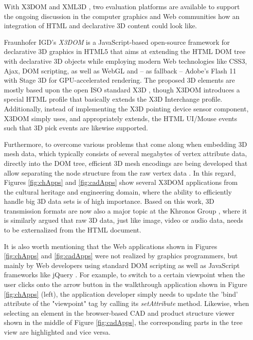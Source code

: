 \documentclass{acmsiggraph}
\begin{document}
With X3DOM \cite{Behr2009} and XML3D \cite{Sons2010}, two evaluation platforms are available to support the ongoing discussion in the computer graphics and Web communities how an integration of HTML and declarative 3D content could look like. 

Fraunhofer IGD's \emph{X3DOM} \cite{Behr2009,Behr12} is a JavaScript-based open-source framework for declarative 3D graphics in HTML5 that aims at extending the HTML DOM tree with declarative 3D objects while employing modern Web technologies like CSS3, Ajax, DOM scripting, as well as WebGL and -- as fallback -- Adobe's Flash 11 with Stage 3D \cite{flash} for GPU-accelerated rendering. The proposed 3D elements are mostly based upon the open ISO standard X3D \cite{Web3D-X3D}, though X3DOM introduces a special HTML profile that basically extends the X3D Interchange profile. Additionally, instead of implementing the X3D pointing device sensor component, X3DOM simply uses, and appropriately extends, the HTML UI/Mouse events such that 3D pick events are likewise supported.

Furthermore, to overcome various problems that come along when embedding 3D mesh data, which typically consists of several megabytes of vertex attribute data, directly into the DOM tree, efficient 3D mesh encodings are being developed that allow separating the node structure from the raw vertex data \cite{Behr12}. In this regard, Figures \ref{fig:chApps} and \ref{fig:cadApps} show several X3DOM applications from the cultural heritage and engineering domain, where the ability to efficiently handle big 3D data sets is of high importance.
Based on this work, 3D transmission formats are now also a major topic at the Khronos Group \cite{Trevett12}, where it is similarly argued that raw 3D data, just like image, video or audio data, needs to be externalized from the HTML document.

It is also worth mentioning that the Web applications shown in Figures \ref{fig:chApps} and \ref{fig:cadApps} were not realized by graphics programmers, but mainly by Web developers using standard DOM scripting as well as JavaScript frameworks like jQuery \cite{jquery}. For example, to switch to a certain viewpoint when the user clicks onto the arrow button in the walkthrough application shown in Figure \ref{fig:chApps} (left), the application developer simply needs to update the 'bind' attribute of the "viewpoint" tag by calling its \emph{setAttribute} method.
Likewise, when selecting an element in the browser-based CAD and product structure viewer shown in the middle of Figure \ref{fig:cadApps}, the corresponding parts in the tree view are highlighted and vice versa.
\end{document}
